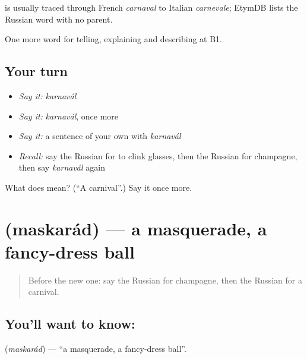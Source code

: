 \begin{cousinweb}
\emph{} is usually traced through French \emph{carnaval} to Italian \emph{carnevale}; EtymDB lists the Russian word with no parent.
\end{cousinweb}

\begin{grammarlens}[title={What you've built}]
One more word for telling, explaining and describing at B1.
\end{grammarlens}

\subsection*{Your turn}
\begin{itemize}
\raggedright
  \item \emph{Say it:} \emph{karnavál}
  \item \emph{Say it:} \emph{karnavál}, once more
  \item \emph{Say it:} a sentence of your own with \emph{karnavál}
  \item \emph{Recall:} say the Russian for to clink glasses, then the Russian for champagne, then say \emph{karnavál} again
\end{itemize}

\begin{tcolorbox}[breakable,colback=teal!4,colframe=teal!35!black,title={Before you move on}]
What does  mean? (\textquotedblleft{}A carnival\textquotedblright{}.) Say it once more.
\end{tcolorbox}
\section[\texorpdfstring{\ru{маскарад} (maskarád)}{маскарад (maskarád)}]{ (maskarád) — a masquerade, a fancy-dress ball}

\label{lesson:RU-C316-maskarad}



\begin{quote}
Before the new one: say the Russian for champagne, then the Russian for a carnival.
\end{quote}

\subsection*{You'll want to know: }
\textbf{} (\emph{maskarád}) — \textquotedblleft{}a masquerade, a fancy-dress ball\textquotedblright{}.

